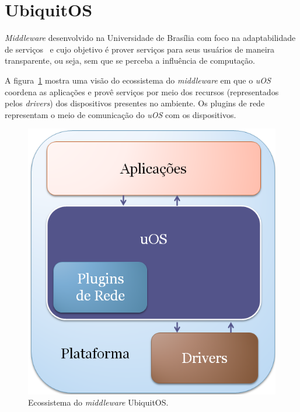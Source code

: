\section{UbiquitOS}

\emph{Middleware} desenvolvido na Universidade de Brasília com foco na adaptabilidade de serviços~\cite{gomes2007} e cujo objetivo é prover serviços para seus usuários de maneira transparente, ou seja, sem que se perceba a influência de computação.

A figura~\ref{fig:ubiquitos} mostra uma visão do ecossistema do \emph{middleware} em que o \emph{uOS} coordena as aplicações e provê serviços por meio dos recursos (representados pelos \emph{drivers}) dos dispositivos presentes no ambiente. Os plugins de rede representam o meio de comunicação do \emph{uOS} com os dispositivos.

\begin{figure}[ht]
	\center
	\includegraphics[scale=0.4]{imagens/ecossistemaUbiquitos}
	\caption{Ecossistema do \emph{middleware} UbiquitOS.}
	\label{fig:ubiquitos}
\end{figure}




